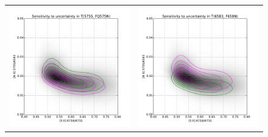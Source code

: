 \documentclass[preprint]{aastex}
\begin{document}
\begin{figure}
\begin{tabular}{ll}
    \includegraphics{ratio-sensitivity-T5755-FQ575N} &
    \includegraphics{ratio-sensitivity-T6583-F658N} \\

\end{tabular}
\end{figure}
\end{document}
